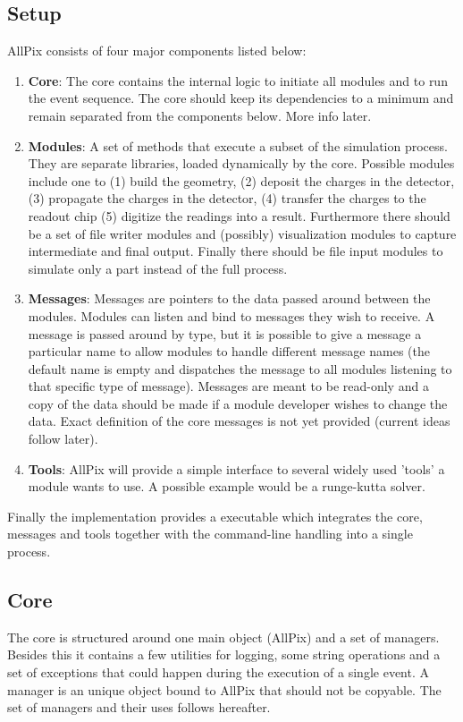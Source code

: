 \subsection{Setup}
AllPix consists of four major components listed below:
\begin{enumerate}
\item \textbf{Core}: The core contains the internal logic to initiate all modules and to run the event sequence. The core should keep its dependencies to a minimum and remain separated from the components below. More info later.
\item \textbf{Modules}: A set of methods that execute a subset of the simulation process. They are separate libraries, loaded dynamically by the core. Possible modules include one to (1) build the geometry, (2) deposit the charges in the detector, (3) propagate the charges in the detector, (4) transfer the charges to the readout chip (5) digitize the readings into a result. Furthermore there should be a set of file writer modules and (possibly) visualization modules to capture intermediate and final output. Finally there should be file input modules to simulate only a part instead of the full process.
\item \textbf{Messages}: Messages are pointers to the data passed around between the modules. Modules can listen and bind to messages they wish to receive. A message is passed around by type, but it is possible to give a message a particular name to allow modules to handle different message names (the default name is empty and dispatches the message to all modules listening to that specific type of message). Messages are meant to be read-only and a copy of the data should be made if a module developer wishes to change the data. Exact definition of the core messages is not yet provided (current ideas follow later).
\item \textbf{Tools}: AllPix will provide a simple interface to several widely used 'tools' a module wants to use. A possible example would be a runge-kutta solver.
\end{enumerate}

Finally the implementation provides a executable which integrates the core, messages and tools together with the command-line handling into a single process. 

\subsection{Core}
The core is structured around one main object (AllPix) and a set of managers. Besides this it contains a few utilities for logging, some string operations and a set of exceptions that could happen during the execution of a single event. A manager is an unique object bound to AllPix that should not be copyable. The set of managers and their uses follows hereafter. 

